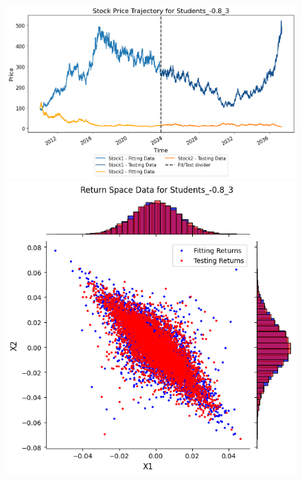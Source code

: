 \begin{figure}
\begin{minipage}{0.9\textwidth}
\begin{minipage}{0.34\textwidth}
        \end{minipage}
    \end{minipage}
    \vfill
    \begin{minipage}{0.9\textwidth}
        \centering
        \begin{minipage}{0.54\textwidth}
            \centering
            \includegraphics[width=\textwidth]{4Method/pictures/PricePort3.png}
        \end{minipage}
        \hfill
        \begin{minipage}{0.34\textwidth}
            \centering
            \includegraphics[width=\textwidth]{4Method/pictures/ReturnPort3.png}

\end{minipage}
\end{minipage}
\end{figure}
